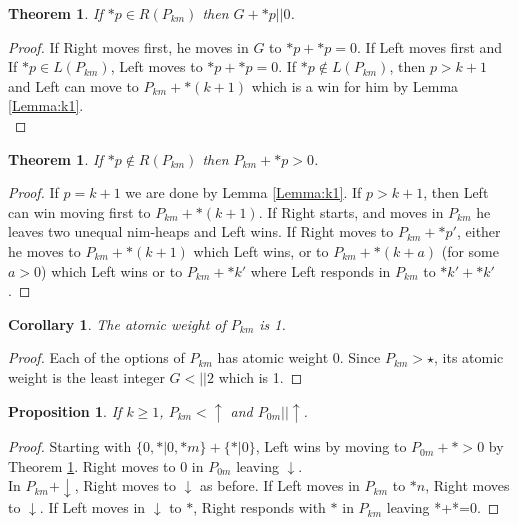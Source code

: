 \documentclass{amsart}
\newtheorem{theorem}[definition]{Theorem}
\newtheorem{corollary}[definition]{Corollary}
\newtheorem{proposition}[definition]{Proposition}
\begin{document}
\begin{theorem}
If $*p\in R(P_{km})$ then $G+*p||0$.
\label{Thm:Comp1}
\end{theorem}

\begin{proof}
If Right moves first, he moves in $G$ to $*p+*p=0$.  If Left moves first and If $*p\in L(P_{km})$, Left moves to $*p+*p=0$.  If $*p\not\in L(P_{km})$, then $p>k+1$ and Left can move to $P_{km}+*(k+1)$ which is a win for him by Lemma \ref{Lemma:k1}.\\
\end{proof}


\begin{theorem}
If $*p\not\in R(P_{km})$ then $P_{km}+*p>0$.
\label{Thm:Comp2}
\end{theorem}

\begin{proof}
If $p=k+1$ we are done by Lemma \ref{Lemma:k1}.  If $p>k+1$, then Left can win moving first to $P_{km}+*(k+1)$.  If Right starts, and moves in $P_{km}$ he leaves two unequal nim-heaps and Left wins.  If Right moves to $P_{km}+*p'$, either he moves to $P_{km}+*(k+1)$ which Left wins, or to $P_{km}+*(k+a)$ (for some $a>0$) which Left wins or to $P_{km}+*k'$ where Left responds in $P_{km}$ to $*k'+*k'$.
\end{proof}

\begin{corollary}
The atomic weight of $P_{km}$ is 1.
\end{corollary}
\begin{proof}
Each of the options of $P_{km}$ has atomic weight 0.  Since $P_{km}>\star$, its atomic weight is the least integer $G<||2$ which is 1.
\end{proof}

\begin{proposition}
If $k\geq 1$, $P_{km}<\uparrow$ and $P_{0m}||\uparrow$.
\end{proposition}
\begin{proof}
Starting with $\{0,*|0,*m\}+\{*|0\}$, Left wins by moving to $P_{0m}+*>0$ by Theorem \ref{Thm:Comp2}.  Right moves to $0$ in $P_{0m}$ leaving $\downarrow$.\\
In $P_{km}+\downarrow$, Right moves to $\downarrow$ as before.  If Left moves in $P_{km}$ to $*n$, Right moves to $\downarrow$.  If Left moves in $\downarrow$ to $*$, Right responds with $*$ in $P_{km}$ leaving *+*=0.
\end{proof}
\end{document}
